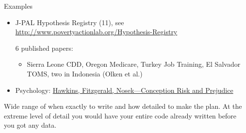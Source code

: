 \documentclass{beamer}
\begin{document}

\begin{frame}{Examples}

\begin{itemize}[<.->]
\item
J-PAL Hypothesis Registry (11), see \url{http://www.povertyactionlab.org/Hypothesis-Registry}

6 published papers:
\begin{itemize}
\item
 Sierra Leone CDD, Oregon Medicare, Turkey Job Training, El Salvador TOMS, two in Indonesia (Olken et al.)
\end{itemize}
\item Psychology: \href{http://pss.sagepub.com/content/26/2/249}{Hawkins, Fitzgerald, Nosek---Conception Risk and Prejudice}
\end{itemize} 
\vspace{0.25in}
Wide range of when exactly to write and how detailed to make the plan. At the extreme level of detail you would have your entire code already written before you got any data.
\end{frame}

{ %
    \begin{frame}[plain]
     \end{frame}
}
\end{document}
